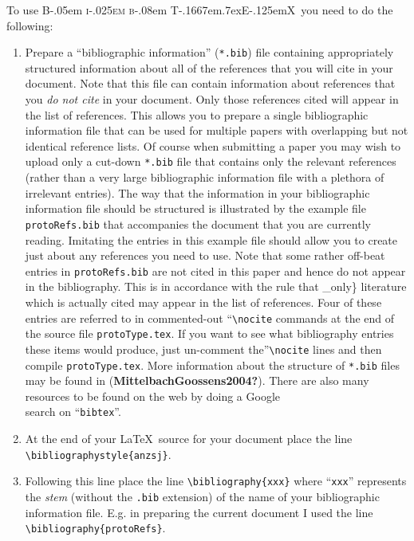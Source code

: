 \documentclass[
  times,
  doublespace]{anzsauth}
\providecommand{\tightlist}{%
  \setlength{\itemsep}{0pt}\setlength{\parskip}{0pt}}\usepackage{longtable,booktabs,array}
\newcommand\BibTeX{{\rmfamily B\kern-.05em \textsc{i\kern-.025em b}\kern-.08em
T\kern-.1667em\lower.7ex\hbox{E}\kern-.125emX}}
\begin{document}
To use \BibTeX~you need to do the following:

\begin{enumerate}
\def\labelenumi{\arabic{enumi}.}
\tightlist
\item
  Prepare a ``bibliographic information'' (\texttt{*.bib}) file
  containing appropriately structured information about all of the
  references that you will cite in your document. Note that this file
  can contain information about references that you \emph{do not cite}
  in your document. Only those references cited will appear in the list
  of references. This allows you to prepare a single bibliographic
  information file that can be used for multiple papers with overlapping
  but not identical reference lists. Of course when submitting a paper
  you may wish to upload only a cut-down \texttt{*.bib} file that
  contains only the relevant references (rather than a very large
  bibliographic information file with a plethora of irrelevant entries).
  The way that the information in your bibliographic information file
  should be structured is illustrated by the example file
  \texttt{protoRefs.bib} that accompanies the document that you are
  currently reading. Imitating the entries in this example file should
  allow you to create just about any references you need to use. Note
  that some rather off-beat entries in \texttt{protoRefs.bib} are not
  cited in this paper and hence do not appear in the bibliography. This
  is in accordance with the rule that \_only\} literature which is
  actually cited may appear in the list of references. Four of these
  entries are referred to in commented-out
  ``\texttt{\textbackslash{}nocite} commands at the end of the source
  file \texttt{protoType.tex}. If you want to see what bibliography
  entries these items would produce, just un-comment
  the''\texttt{\textbackslash{}nocite} lines and then compile
  \texttt{protoType.tex}. More information about the structure of
  \texttt{*.bib} files may be found in
  (\textbf{MittelbachGoossens2004?}). There are also many resources to
  be found on the web by doing a Google\texttrademark\\
  search on ``\texttt{bibtex}''.
\item
  At the end of your \LaTeX~source for your document place the line
  \texttt{\textbackslash{}bibliographystyle\{anzsj\}}.
\item
  Following this line place the line
  \texttt{\textbackslash{}bibliography\{xxx\}} where ``\texttt{xxx}''
  represents the \emph{stem} (without the \texttt{.bib} extension) of
  the name of your bibliographic information file. E.g. in preparing the
  current document I used the line
  \texttt{\textbackslash{}bibliography\{protoRefs\}}.
\end{enumerate}
\end{document}

